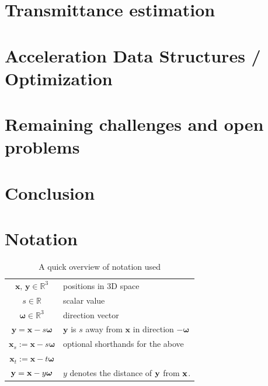 \section{Transmittance estimation}
\label{section:transmittance}

\section{Acceleration Data Structures / Optimization}



\section{Remaining challenges and open problems}

\section{Conclusion}


%




\appendix

\section{Notation}\label{appendix:notation}
\begin{table}[h]
\centering
\begin{tabular}{|c|l|}
    \hline
    $\textbf{x, y}\in \mathbb{R}^3$ & 
    positions in 3D space \\
    $s \in \mathbb{R}$ &
    scalar value \\
    $\boldsymbol\omega \in \mathbb{R}^3$ & direction vector \\
    $\textbf{y} = \textbf{x}-s\boldsymbol\omega$ &
    $\textbf{y}$ is $s$ away from $\textbf{x}$ in direction $-\boldsymbol{\omega}$\\
    \hline
    $\textbf{x}_s := \textbf{x}-s\boldsymbol\omega$ &
    optional shorthands for the above\\
    $\textbf{x}_t := \textbf{x}-t\boldsymbol\omega$ & \\
    \hline
    $\textbf{y} = \textbf{x} - y\boldsymbol{\omega}$ &
    $y$ denotes the distance of $\textbf{y}$ from $\textbf{x}$.\\
    \hline
\end{tabular}
\caption{A quick overview of notation used}
\end{table}

